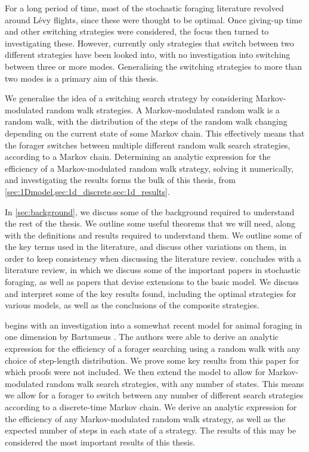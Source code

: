 For a long period of time, most of the stochastic foraging literature revolved around L\'{e}vy flights, since these were thought to be optimal. Once giving-up time and other switching strategies were considered, the focus then turned to investigating these. However, currently only strategies that switch between two different strategies have been looked into, with no investigation into switching between three or more modes. Generalising the switching strategies to more than two modes is a primary aim of this thesis.

We generalise the idea of a switching search strategy by considering Markov-modulated random walk strategies. A Markov-modulated random walk is a random walk, with the distribution of the steps of the random walk changing depending on the current state of some Markov chain. This effectively means that the forager switches between multiple different random walk search strategies, according to a Markov chain. Determining an analytic expression for the efficiency of a Markov-modulated random walk strategy, solving it numerically, and investigating the results forms the bulk of this thesis, from \cref{sec:1Dmodel,sec:1d_discrete,sec:1d_results}.


In \cref{sec:background}, we discuss some of the background required to understand the rest of the thesis. We outline some useful theorems that we will need, along with the definitions and results required to understand them. We outline some of the key terms used in the literature, and discuss other variations on them, in order to keep consistency when discussing the literature review.  concludes with a literature review, in which we discuss some of the important papers in stochastic foraging, as well as papers that devise extensions to the basic model. We discuss and interpret some of the key results found, including the optimal strategies for various models, as well as the conclusions of the composite strategies.

 begins with an investigation into a somewhat recent model for animal foraging in one dimension by Bartumeus \etal \cite{Bartumeus_2013}. The authors were able to derive an analytic expression for the efficiency of a forager searching using a random walk with any choice of step-length distribution. We prove some key results from this paper for which proofs were not included. We then extend the model to allow for Markov-modulated random walk search strategies, with any number of states. This means we allow for a forager to switch between any number of different search strategies according to a discrete-time Markov chain. We derive an analytic expression for the efficiency of any Markov-modulated random walk strategy, as well as the expected number of steps in each state of a strategy. The results of this  may be considered the most important results of this thesis.


